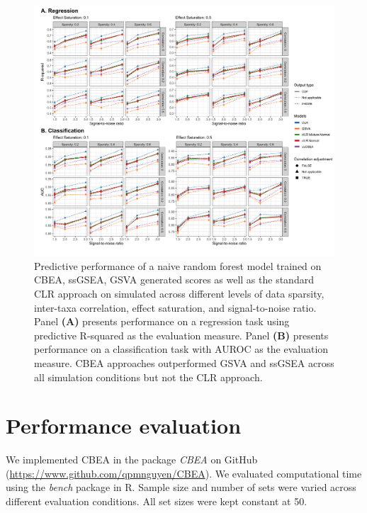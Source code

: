 \documentclass{article}
\begin{document}
\begin{figure}[!h]
    \centering
    \includegraphics[width = \linewidth]{figures/sim_pred_combined.png}
    \caption{Predictive performance of a naive random forest model trained on CBEA, ssGSEA, GSVA generated scores as well as the standard CLR approach on simulated across different levels of data sparsity, inter-taxa correlation, effect saturation, and signal-to-noise ratio. Panel \textbf{(A)} presents performance on a regression task using predictive R-squared as the evaluation measure. Panel \textbf{(B)} presents performance on a classification task with AUROC as the evaluation measure. CBEA approaches outperformed GSVA and ssGSEA across all simulation conditions but not the CLR approach.}
    \label{fig:s5}
\end{figure}


\section{Performance evaluation} 
We implemented CBEA in the package \emph{CBEA} on GitHub (\url{https://www.github.com/qpmnguyen/CBEA}). We evaluated computational time using the \emph{bench} package in R. Sample size and number of sets were varied across different evaluation conditions. All set sizes were kept constant at 50. 
\end{document}
